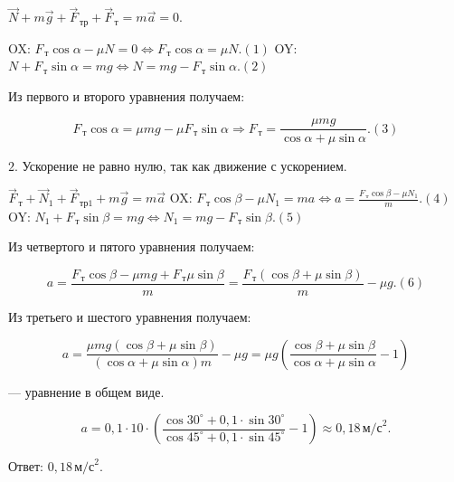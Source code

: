 \documentclass[12pt,a4paper]{article}
\begin{document}
{$\vec N + m\vec g + \vec F_{\,\text{тр}} + \vec F_{\,\text{т}} = m\vec a = 0.$

OX: $F_{\,\text{т}} \cos \alpha - \mu N = 0 \Longleftrightarrow F_{\,\text{т}} \cos \alpha = \mu N. ( 1 )$
OY: $N + F_{\,\text{т}} \sin \alpha = mg \Longleftrightarrow N= mg - F_{\,\text{т}} \sin \alpha . ( 2 )$

Из первого и второго уравнения получаем:

\[F_{\,\text{т}} \cos \alpha =\mu mg - \mu F_{\,\text{т}} \sin \alpha \Rightarrow F_{\,\text{т}}= \frac{\mu mg}{\cos \alpha + \mu \sin \alpha} . ( 3 )\]

\begin{center}\end{center}$2$.  Ускорение не равно нулю, так как движение с ускорением.

$\vec F_{\,\text{т}} + \vec N_1 + \vec F_{\,\text{тр}1} + m\vec g = m\vec a$
OX: $F_{\,\text{т}} \cos \beta - \mu N_1 = ma \Longleftrightarrow a= \frac{F_{\,\text{т}} \cos \beta - \mu N_1}{m} . ( 4 )$
OY: $N_1 + F_{\,\text{т}} \sin \beta = mg \Longleftrightarrow N_1 = mg - F_{\,\text{т}} \sin \beta . ( 5 )$

Из четвертого и пятого уравнения получаем:

\[a= \frac{F_{\,\text{т}} \cos \beta - \mu mg + F_{\,\text{т}}\mu \sin \beta}{m} = \frac{F_{\,\text{т}} ( \cos \beta + \mu \sin \beta )}{m} - \mu g. ( 6 )\]

Из третьего и шестого уравнения получаем:

\[a= \frac{\mu mg ( \cos \beta + \mu \sin \beta )}{( \cos \alpha + \mu \sin \alpha ) m} - \mu g = \mu g ( \frac{\cos \beta + \mu \sin \beta}{\cos \alpha + \mu \sin \alpha} - 1 )\]

  — уравнение в общем виде.

\[a=0{,}1 \cdot 10 \cdot ( \frac{\cos 30 ^\circ + 0{,}1 \cdot \sin 30 ^\circ}{\cos 45 ^\circ + 0{,}1 \cdot \sin 45 ^\circ} - 1 ) \approx 0{,}18\,\text{м/с} ^2 .\]

Ответ: $0{,}18\,\text{м/с}^{2}$.
}
\end{document}
